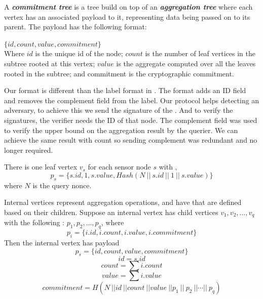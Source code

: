 	\begin{definition}\cite{chan2006secure}
		A \textbf{\textit{commitment tree}} is a tree build on top of an \textbf{\textit{aggregation tree}} where each vertex has an associated payload to it, representing data being passed on to its parent. The payload has the following format:

		$\{id, count, value, commitment\}$\\
		Where $id$ is the unique id of the node; $count$ is the number of leaf vertices in the subtree rooted at this vertex; $value$ is the aggregate computed over all the leaves rooted in the subtree; and commitment is the cryptographic commitment.

	\end{definition}

	Our \payload format is different than the label format in \cite{chan2006secure}.
	The \payload format adds an ID field and removes the complement field from the label. 
	Our protocol helps detecting an adversary, to achieve this we send the signature of the \payload. 
	And to verify the signatures, the verifier needs the ID of that node.
	The complement field was used to verify the upper bound on the aggregation result by the querier. We can achieve the same result with count so sending complement was redundant and no longer required.     

	There is one leaf vertex $v_{s}$ for each sensor node $s$ with \payload ,
	\begin{equation}
		p_{s} = \{ s.id, 1,s.value, Hash( N\ ||\  s.id\ ||\  1\  ||\  s.value ) \} 
	\end{equation}
	where $N$ is the query nonce.

	Internal vertices represent aggregation operations, and have \payloads that are defined based on their children. Suppose an internal vertex has child vertices $v_{1}, v_{2},\dotsc, v_{q}$ with the following \payloads: $p_{1}, p_{2},\dotsc, p_{q}$, where
	\begin{equation}
		p_{i} = \{ i.id, i.count, i.value, i.commitment\} 
	\end{equation}
	Then the internal vertex has payload 
	\begin{equation}
		p_{s} = \{ id, count, value, commitment \} 
	\end{equation}
	\begin{equation}
		id = s.id 
	\end{equation}	
	\begin{equation}
		count = \sum{i.count}		
	\end{equation}
	\begin{equation}
		value = \sum{i.value}		
	\end{equation}
	\begin{equation}
		commitment = H (N\ ||  id\ ||  count\ ||  value\ || p_{1}\ ||\ p_{2}\ || \dotsb ||\ p_{q})		
	\end{equation}

